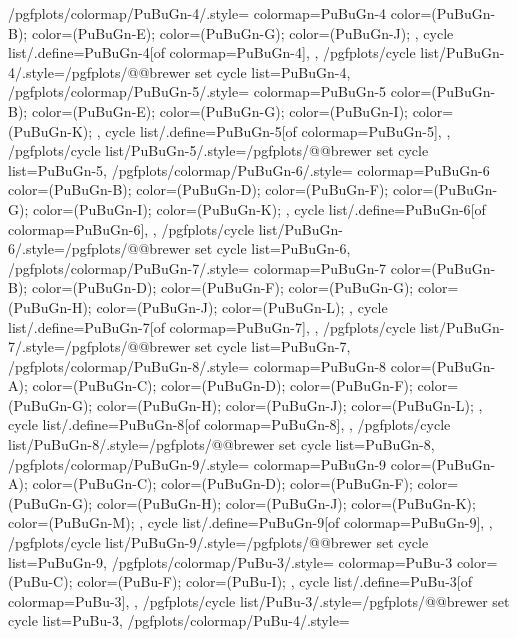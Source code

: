 {  %
  /pgfplots/colormap/PuBuGn-4/.style={
    colormap={PuBuGn-4}{
      color=(PuBuGn-B);
      color=(PuBuGn-E);
      color=(PuBuGn-G);
      color=(PuBuGn-J);
    },
    cycle list/.define={PuBuGn-4}{[of colormap=PuBuGn-4]},
  },
  /pgfplots/cycle list/PuBuGn-4/.style={/pgfplots/@@brewer set cycle list={PuBuGn-4}},
  /pgfplots/colormap/PuBuGn-5/.style={
    colormap={PuBuGn-5}{
      color=(PuBuGn-B);
      color=(PuBuGn-E);
      color=(PuBuGn-G);
      color=(PuBuGn-I);
      color=(PuBuGn-K);
    },
    cycle list/.define={PuBuGn-5}{[of colormap=PuBuGn-5]},
  },
  /pgfplots/cycle list/PuBuGn-5/.style={/pgfplots/@@brewer set cycle list={PuBuGn-5}},
  /pgfplots/colormap/PuBuGn-6/.style={
    colormap={PuBuGn-6}{
      color=(PuBuGn-B);
      color=(PuBuGn-D);
      color=(PuBuGn-F);
      color=(PuBuGn-G);
      color=(PuBuGn-I);
      color=(PuBuGn-K);
    },
    cycle list/.define={PuBuGn-6}{[of colormap=PuBuGn-6]},
  },
  /pgfplots/cycle list/PuBuGn-6/.style={/pgfplots/@@brewer set cycle list={PuBuGn-6}},
  /pgfplots/colormap/PuBuGn-7/.style={
    colormap={PuBuGn-7}{
      color=(PuBuGn-B);
      color=(PuBuGn-D);
      color=(PuBuGn-F);
      color=(PuBuGn-G);
      color=(PuBuGn-H);
      color=(PuBuGn-J);
      color=(PuBuGn-L);
    },
    cycle list/.define={PuBuGn-7}{[of colormap=PuBuGn-7]},
  },
  /pgfplots/cycle list/PuBuGn-7/.style={/pgfplots/@@brewer set cycle list={PuBuGn-7}},
  /pgfplots/colormap/PuBuGn-8/.style={
    colormap={PuBuGn-8}{
      color=(PuBuGn-A);
      color=(PuBuGn-C);
      color=(PuBuGn-D);
      color=(PuBuGn-F);
      color=(PuBuGn-G);
      color=(PuBuGn-H);
      color=(PuBuGn-J);
      color=(PuBuGn-L);
    },
    cycle list/.define={PuBuGn-8}{[of colormap=PuBuGn-8]},
  },
  /pgfplots/cycle list/PuBuGn-8/.style={/pgfplots/@@brewer set cycle list={PuBuGn-8}},
  /pgfplots/colormap/PuBuGn-9/.style={
    colormap={PuBuGn-9}{
      color=(PuBuGn-A);
      color=(PuBuGn-C);
      color=(PuBuGn-D);
      color=(PuBuGn-F);
      color=(PuBuGn-G);
      color=(PuBuGn-H);
      color=(PuBuGn-J);
      color=(PuBuGn-K);
      color=(PuBuGn-M);
    },
    cycle list/.define={PuBuGn-9}{[of colormap=PuBuGn-9]},
  },
  /pgfplots/cycle list/PuBuGn-9/.style={/pgfplots/@@brewer set cycle list={PuBuGn-9}},
  /pgfplots/colormap/PuBu-3/.style={
    colormap={PuBu-3}{
      color=(PuBu-C);
      color=(PuBu-F);
      color=(PuBu-I);
    },
    cycle list/.define={PuBu-3}{[of colormap=PuBu-3]},
  },
  /pgfplots/cycle list/PuBu-3/.style={/pgfplots/@@brewer set cycle list={PuBu-3}},
  /pgfplots/colormap/PuBu-4/.style={
}}
